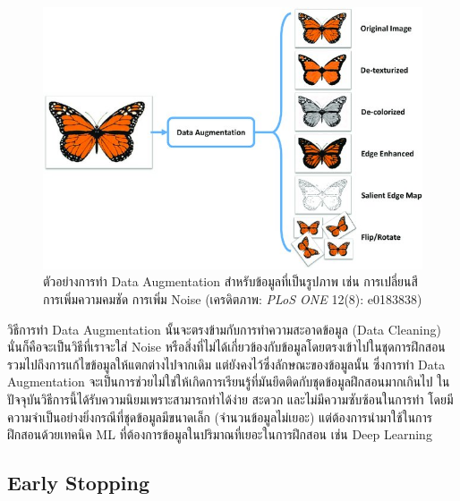 \begin{figure}[H]
    \centering
    \includegraphics[width=0.9\linewidth]{fig/data_aug_butterfly.jpg}
    \caption{ตัวอย่างการทำ Data Augmentation สำหรับข้อมูลที่เป็นรูปภาพ เช่น การเปลี่ยนสี การเพิ่มความคมชัด การเพิ่ม Noise 
    (เครดิตภาพ: \textit{PLoS ONE} 12(8): e0183838)}
    \label{fig:data_aug_butterfly}
\end{figure}

วิธีการทำ Data Augmentation นั้นจะตรงข้ามกับการทำความสะอาดข้อมูล (Data Cleaning) นั่นก็คือจะเป็นวิธีที่เราจะใส่ Noise หรือสิ่งที่ไม่ได้เกี่ยวข้องกับข้อมูลโดยตรงเข้าไปในชุดการฝึกสอน รวมไปถึงการแก้ไขข้อมูลให้แตกต่างไปจากเดิม แต่ยังคงไว้ซึ่งลักษณะของข้อมูลนั้น 
ซึ่งการทำ Data Augmentation จะเป็นการช่วยไม่ใช่ให้เกิดการเรียนรู้ที่มันยึดติดกับชุดข้อมูลฝึกสอนมากเกินไป ในปัจจุบันวิธีการนี้ได้รับความนิยมเพราะสามารถทำได้ง่าย สะดวก และไม่มีความซับซ้อนในการทำ โดยมีความจำเป็นอย่างยิ่งกรณีที่ชุดข้อมูลมีขนาดเล็ก (จำนวนข้อมูลไม่เยอะ) 
แต่ต้องการนำมาใช้ในการฝึกสอนด้วยเทคนิค ML ที่ต้องการข้อมูลในปริมาณที่เยอะในการฝึกสอน เช่น Deep Learning\autocite{bengio2021}

\subsection{Early Stopping}
\label{ssec:early_stop}

